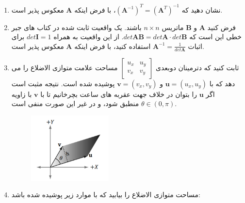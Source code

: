 {\begin{spacing}{1.5}
\begin{enumerate}[label=\textbf{\arabic*}.]
            \item {نشان دهید که $(\textbf{A}^{-1})^{T}=(\textbf{A}^{T})^{-1}$، با فرض اینکه $\textbf{A}$ معکوس پذیر است.}  \\\textbf{\vspace{6pt}}

            \item {فرض کنید $\textbf{A}$ و $\textbf{B}$ ماتریس $n\times n$ باشند.
            یک واقعیت ثابت شده در کتاب های جبر خطی این است که $det\textbf{AB}=det\textbf{A}\cdot det\textbf{B}$.
            از این واقعیت به همراه $det\textbf{I}=1$ برای اثبات $\textbf{A}^{-1}=\frac{\displaystyle 1}{\displaystyle det\textbf{A}}$ استفاده کنید،
            با فرض اینکه $\textbf{A}$ معکوس پذیر است.} \\\textbf{\vspace{6pt}}

            \item {ثابت کنید که دترمینان دوبعدی  $\begin{bmatrix}
                                                      u_{x} & u_{y} \\
                                                      v_{x} & v_{y}
            \end{bmatrix}$ مساحت علامت متوازی الاضلاع را می دهد که با $\textbf{u}=(u_{x},u_{y})$ و $\textbf{v}=(v_{x},v_{y})$ پوشیده شده است.
            نتیجه مثبت است اگر $\textbf{u}$ را بتوان در خلاف جهت عقربه های ساعت بچرخانیم تا با $\textbf{v}$ با زاویه $\theta\in(0,\pi)$ منطبق شود، و در غیر این صورت منفی است.
                \begin{figure}[H]
                    \centering
                    \setlength{\belowcaptionskip}{-10pt}
                    \includegraphics[width=0.4\textwidth]{Images/4/2/4.Session.1.2.2}
                    \label{fig:4.Session.1.2.2}
                \end{figure}
            }

            \item {مساحت متوازی الاضلاع را بیابید که با موارد زیر پوشیده شده باشد:
            }


\end{enumerate}
\end{spacing}}
